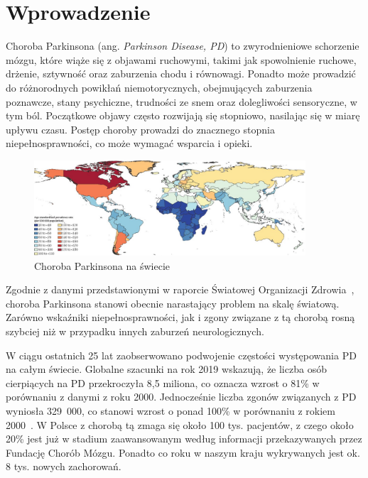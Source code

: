 \chapter{Wprowadzenie} \label{ch:wprowadzenie}

Choroba Parkinsona (ang. \emph {Parkinson Disease, PD}) to zwyrodnieniowe schorzenie mózgu, które wiąże się z objawami ruchowymi, takimi jak spowolnienie ruchowe,
drżenie, sztywność oraz zaburzenia chodu i równowagi.
Ponadto może prowadzić do różnorodnych powikłań niemotorycznych, obejmujących zaburzenia poznawcze, stany psychiczne,
trudności ze snem oraz dolegliwości sensoryczne, w tym ból.
Początkowe objawy często rozwijają się stopniowo, nasilając się w miarę upływu czasu.
Postęp choroby prowadzi do znacznego stopnia niepełnosprawności, co może wymagać wsparcia i opieki.

\begin{figure}[htbp]
	\centering
	\includegraphics[width=0.9\textwidth]{./img/map}
	\caption{Choroba Parkinsona na świecie~\cite {global_PD}}
    \label{fig:PD_map}
\end{figure}

Zgodnie z danymi przedstawionymi w raporcie Światowej Organizacji Zdrowia~\cite{WHO}, choroba Parkinsona stanowi obecnie narastający problem na skalę światową.
Zarówno wskaźniki niepełnosprawności, jak i zgony związane z tą chorobą rosną szybciej niż w przypadku innych zaburzeń neurologicznych.

W ciągu ostatnich 25 lat zaobserwowano podwojenie częstości występowania PD na całym świecie.
Globalne szacunki na rok 2019 wskazują, że liczba osób cierpiących na PD przekroczyła 8,5 miliona, co oznacza wzrost o 81\% w porównaniu z danymi z roku 2000.
Jednocześnie liczba zgonów związanych z PD wyniosła 329~000, co stanowi wzrost o ponad 100\% w porównaniu z rokiem 2000~\cite{global_PD}.
W Polsce z chorobą tą zmaga się około 100 tys.
pacjentów, z czego około 20\% jest już w stadium zaawansowanym
według informacji przekazywanych przez Fundację Chorób Mózgu.
Ponadto co roku w naszym kraju wykrywanych jest ok.
8 tys.
nowych zachorowań.

